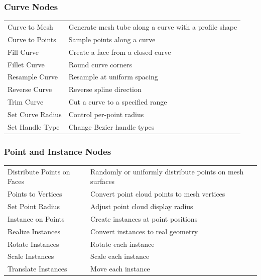 \subsubsection{Curve Nodes}

\begin{center}
\begin{tabularx}{\textwidth}{L{4cm}X}
\toprule
{}
 &  \\
\midrule
Curve to Mesh & Generate mesh tube along a curve with a profile shape \\
Curve to Points & Sample points along a curve \\
Fill Curve & Create a face from a closed curve \\
Fillet Curve & Round curve corners \\
Resample Curve & Resample at uniform spacing \\
Reverse Curve & Reverse spline direction \\
Trim Curve & Cut a curve to a specified range \\
Set Curve Radius & Control per-point radius \\
Set Handle Type & Change Bezier handle types \\
\bottomrule
\end{tabularx}
\end{center}

\subsubsection{Point and Instance Nodes}

\begin{center}
\begin{tabularx}{\textwidth}{L{4cm}X}
\toprule
{}
 &  \\
\midrule
Distribute Points on Faces & Randomly or uniformly distribute points on mesh surfaces \\
Points to Vertices & Convert point cloud points to mesh vertices \\
Set Point Radius & Adjust point cloud display radius \\
Instance on Points & Create instances at point positions \\
Realize Instances & Convert instances to real geometry \\
Rotate Instances & Rotate each instance \\
Scale Instances & Scale each instance \\
Translate Instances & Move each instance \\
\bottomrule
\end{tabularx}
\end{center}

